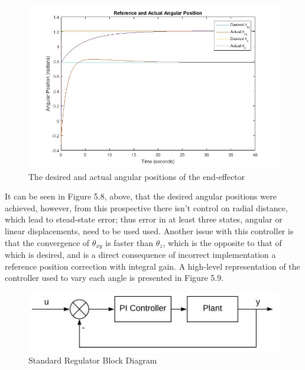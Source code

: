 \documentclass[12pt,openany,a4paper]{book}
\begin{document}
\clearpage

\begin{center}
\begin{figure}[htb]
  \includegraphics[width=1\linewidth]{matlab_inv_des_act_angle.jpg}
\caption{The desired and actual angular positions of the end-effector}
\end{figure}
\end{center}

It can be seen in Figure 5.8, above, that the desired angular positions were achieved, however, from this prospective there isn't control on radial distance, which lead to stead-state error; thus error in at least three states, angular or linear displacements, need to be used used. Another issue with this controller is that the convergence of $\theta_{xy}$ is faster than $\theta_z$, which is the opposite to that of which is desired, and is a direct consequence of incorrect implementation a reference position correction with integral gain. A high-level representation of the controller used to vary each angle is presented in Figure 5.9.

\begin{center}
\begin{figure}[htb]
  \includegraphics[width=0.8\linewidth]{control_system.jpg}
\caption{Standard Regulator Block Diagram}
\end{figure}
\end{center}
\end{document}
